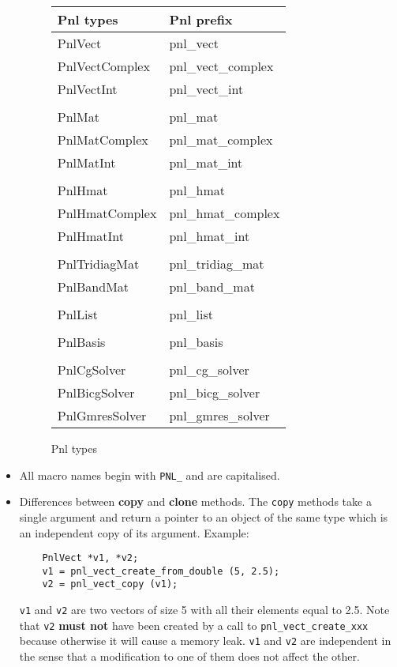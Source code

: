 \documentclass[a4paper,11pt,twoside]{article}
\begin{document}
\begin{itemize}
    \begin{figure}[h!]
      \centering\begin{tabular}{|l|l|}
      \hline
      Pnl types & Pnl prefix \\
      \hline
      PnlVect & pnl_vect \\
      PnlVectComplex & pnl_vect_complex \\
      PnlVectInt & pnl_vect_int \\
       &\\
      PnlMat & pnl_mat \\
      PnlMatComplex & pnl_mat_complex \\
      PnlMatInt & pnl_mat_int \\
      & \\
      PnlHmat & pnl_hmat \\
      PnlHmatComplex & pnl_hmat_complex \\
      PnlHmatInt & pnl_hmat_int \\
      & \\
      PnlTridiagMat & pnl_tridiag_mat \\
      PnlBandMat & pnl_band_mat \\
      & \\
      PnlList & pnl_list \\
      & \\
      PnlBasis & pnl_basis \\
      & \\
      PnlCgSolver & pnl_cg_solver \\
      PnlBicgSolver & pnl_bicg_solver \\
      PnlGmresSolver & pnl_gmres_solver \\
      \hline
    \end{tabular}
    \caption{Pnl types}
    \label{pnltypes}
  \end{figure}

  \item All macro names begin with \verb!PNL_! and are capitalised.

  \item Differences between \textbf{copy} and \textbf{clone} methods.
    The \verb!copy! methods take a single argument and return a pointer to an object
    of the same type which is an independent copy of its argument. 
    Example:
    \begin{verbatim}
    PnlVect *v1, *v2;
    v1 = pnl_vect_create_from_double (5, 2.5);
    v2 = pnl_vect_copy (v1);
    \end{verbatim}
    \verb!v1! and \verb!v2! are two vectors of size 5 with all their elements
    equal to 2.5. Note that \verb!v2! {\bf must not} have been created by a call
    to \verb!pnl_vect_create_xxx! because otherwise it will cause a memory leak.
    \verb!v1! and \verb!v2! are independent in the sense that a modification to
    one of them does not affect the other.


\end{itemize}
\end{document}
